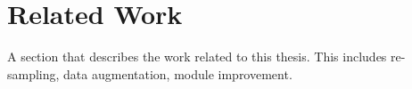 


\section{Related Work}
A section that describes the work related to this thesis. This includes re-sampling, data augmentation, module improvement.


